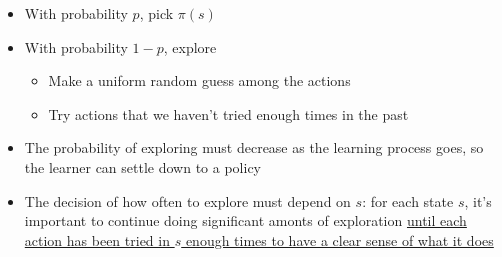   \begin{itemize}
    \item With probability $ p $, pick $ \pi\left( s \right) $
    \item With probability $ 1 - p $, explore
    \begin{itemize}
      \item Make a uniform random guess among the actions
      \item Try actions that we haven't tried enough times in the past
    \end{itemize}

    \item The probability of exploring must decrease as the learning process
    goes, so the learner can settle down to a policy
    \item The decision of how often to explore must depend on $ s $:
    for each state $ s $, it's important to continue doing significant
    amonts of exploration \ul{until each action has been tried in $ s $
    enough times to have a clear sense of what it does}
  \end{itemize}
